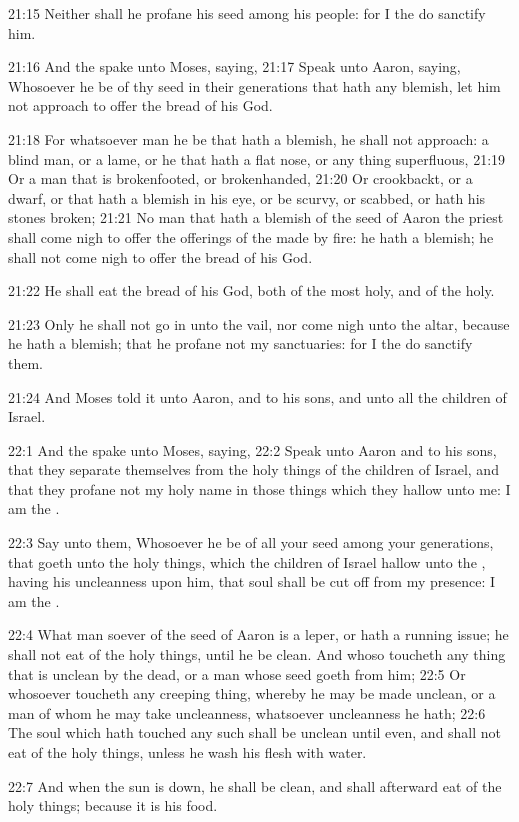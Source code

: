 21:15 Neither shall he profane his seed among his people: for I the \LORD do sanctify him.

21:16 And the \LORD spake unto Moses, saying, 21:17 Speak unto Aaron, saying, Whosoever he be of thy seed in their generations that hath any blemish, let him not approach to offer the bread of his God.

21:18 For whatsoever man he be that hath a blemish, he shall not approach: a blind man, or a lame, or he that hath a flat nose, or any thing superfluous, 21:19 Or a man that is brokenfooted, or brokenhanded, 21:20 Or crookbackt, or a dwarf, or that hath a blemish in his eye, or be scurvy, or scabbed, or hath his stones broken; 21:21 No man that hath a blemish of the seed of Aaron the priest shall come nigh to offer the offerings of the \LORD made by fire: he hath a blemish; he shall not come nigh to offer the bread of his God.

21:22 He shall eat the bread of his God, both of the most holy, and of the holy.

21:23 Only he shall not go in unto the vail, nor come nigh unto the altar, because he hath a blemish; that he profane not my sanctuaries: for I the \LORD do sanctify them.

21:24 And Moses told it unto Aaron, and to his sons, and unto all the children of Israel.

22:1 And the \LORD spake unto Moses, saying, 22:2 Speak unto Aaron and to his sons, that they separate themselves from the holy things of the children of Israel, and that they profane not my holy name in those things which they hallow unto me: I am the \LORD.

22:3 Say unto them, Whosoever he be of all your seed among your generations, that goeth unto the holy things, which the children of Israel hallow unto the \LORD, having his uncleanness upon him, that soul shall be cut off from my presence: I am the \LORD.

22:4 What man soever of the seed of Aaron is a leper, or hath a running issue; he shall not eat of the holy things, until he be clean.  And whoso toucheth any thing that is unclean by the dead, or a man whose seed goeth from him; 22:5 Or whosoever toucheth any creeping thing, whereby he may be made unclean, or a man of whom he may take uncleanness, whatsoever uncleanness he hath; 22:6 The soul which hath touched any such shall be unclean until even, and shall not eat of the holy things, unless he wash his flesh with water.

22:7 And when the sun is down, he shall be clean, and shall afterward eat of the holy things; because it is his food.


